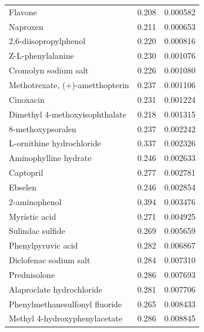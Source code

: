 \begin{table}[h!]
\begin{center}
\begin{tabular}{l | l l}
  Flavone                                   & 0.208 & 0.000582 \\
  Naproxen                                  & 0.211 & 0.000653 \\
  2,6-diisopropylphenol                     & 0.220 & 0.000816 \\
  Z-L-phenylalanine                         & 0.230 & 0.001076 \\
  Cromolyn sodium salt                      & 0.226 & 0.001080 \\
  Methotrexate, (+)-ametthopterin           & 0.237 & 0.001106 \\
  Cinoxacin                                 & 0.231 & 0.001224 \\
  Dimethyl 4-methoxyisophthalate            & 0.218 & 0.001315 \\
  8-methoxypsoralen                         & 0.237 & 0.002242 \\
  L-ornithine hydrochloride                 & 0.337 & 0.002326 \\
  Aminophylline hydrate                     & 0.246 & 0.002633 \\
  Captopril                                 & 0.277 & 0.002781 \\
  Ebselen                                   & 0.246 & 0.002854 \\
  2-aminophenol                             & 0.394 & 0.003476 \\
  Myristic acid                             & 0.271 & 0.004925 \\
  Sulindac sulfide                          & 0.269 & 0.005659 \\
  Phenylpyruvic acid                        & 0.282 & 0.006867 \\
  Diclofenac sodium salt                    & 0.284 & 0.007310 \\
  Prednisolone                              & 0.286 & 0.007693 \\
  Alaproclate hydrochloride                 & 0.281 & 0.007706 \\
  Phenylmethanesulfonyl fluoride            & 0.265 & 0.008433 \\
  Methyl 4-hydroxyphenylacetate             & 0.286 & 0.008845
\end{tabular}
\end{center}
\end{table}

\pagebreak



